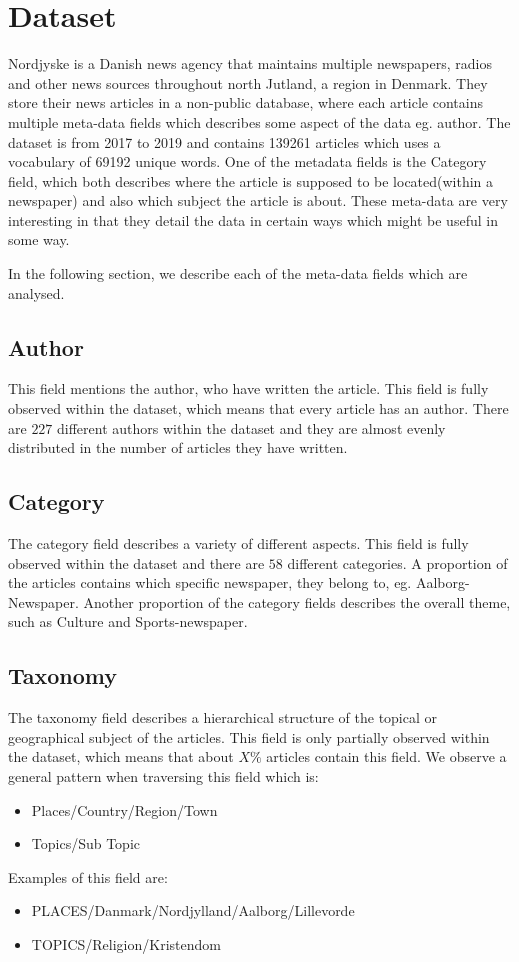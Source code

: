 \section{Dataset}
Nordjyske is a Danish news agency that maintains multiple newspapers, radios and other news sources throughout north Jutland, a region in Denmark.
They store their news articles in a non-public database, where each article contains multiple meta-data fields which describes some aspect of the data eg. author.
The dataset is from 2017 to 2019 and contains 139261 articles which uses a vocabulary of 69192 unique words.
One of the metadata fields is the Category field, which both describes where the article is supposed to be located(within a newspaper) and also which subject the article is about.
These meta-data are very interesting in that they detail the data in certain ways which might be useful in some way.

In the following section, we describe each of the meta-data fields which are analysed.

\subsection{Author}
This field mentions the author, who have written the article.
This field is fully observed within the dataset, which means that every article has an author.
There are $227$ different authors within the dataset and they are almost evenly distributed in the number of articles they have written.

\subsection{Category}
The category field describes a variety of different aspects. 
This field is fully observed within the dataset and there are $58$ different categories.
A proportion of the articles contains which specific newspaper, they belong to, eg. Aalborg-Newspaper.
Another proportion of the category fields describes the overall theme, such as Culture and Sports-newspaper.


\subsection{Taxonomy}
The taxonomy field describes a hierarchical structure of the topical or geographical subject of the articles.
This field is only partially observed within the dataset, which means that about $X\%$ articles contain this field.
We observe a general pattern when traversing this field which is:
\begin{itemize}
	\item Places/Country/Region/Town
	\item Topics/Sub Topic
\end{itemize}
Examples of this field are:
\begin{itemize}
	\item PLACES/Danmark/Nordjylland/Aalborg/Lillevorde
	\item TOPICS/Religion/Kristendom
\end{itemize}